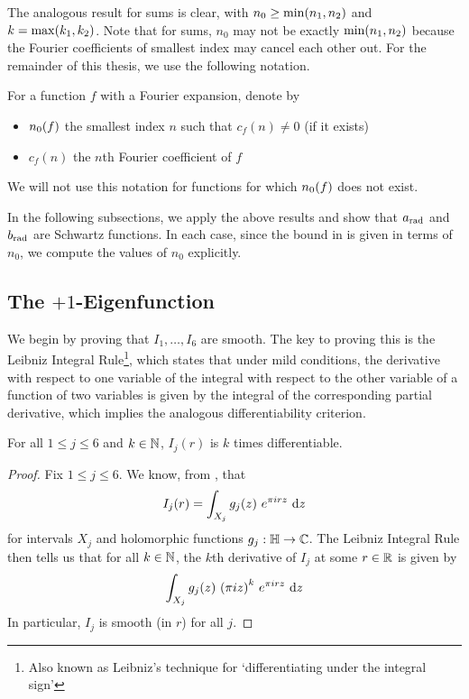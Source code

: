 The analogous result for sums is clear, with $n_0 \geq \min\!\left( n_1, n_2 \right)$ and $k = \max\!\left( k_1, k_2 \right)$. Note that for sums, $n_0$ may not be exactly $\min\!\left( n_1, n_2 \right)$ because the Fourier coefficients of smallest index may cancel each other out. For the remainder of this thesis, we use the following notation.

\begin{boxnotation}
    For a function $f$ with a Fourier expansion, denote by
    \begin{itemize}
        \item $n_0\!\left( f \right)$ the smallest index $n$ such that $c_f(n) \neq 0$ (if it exists)
        \item $c_f(n)$ the $n$th Fourier coefficient of $f$
    \end{itemize}
    We will not use this notation for functions for which $n_0\!\left( f \right)$ does not exist.
\end{boxnotation}

In the following subsections, we apply the above results and show that $a_{\operatorname{rad}}$ and $b_{\operatorname{rad}}$ are Schwartz functions. In each case, since the bound in  is given in terms of $n_0$, we compute the values of $n_0$ explicitly.

\subsection{The $+1$-Eigenfunction}
\label{Ch4:Subec:Schwartzness_a}

We begin by proving that $I_1, \ldots, I_6$ are smooth. The key to proving this is the Leibniz Integral Rule\footnote{Also known as Leibniz's technique for `differentiating under the integral sign'}, which states that under mild conditions, the derivative with respect to one variable of the integral with respect to the other variable of a function of two variables is given by the integral of the corresponding partial derivative, which implies the analogous differentiability criterion.

\begin{boxlemma}\label{Ch4:Lemma:Ij_Smooth}
    For all $1 \leq j \leq 6$ and $k \in \mathbb{N}$, $I_j(r)$ is $k$ times differentiable.
\end{boxlemma}
\begin{proof}
    Fix $1 \leq j \leq 6$. We know, from , that
    \begin{align*}
        I_j(r) = \int_{X_j} g_j\!\left( z \right) \, e^{\pi i r z} \, \operatorname{d}\!{z}
    \end{align*}
    for intervals $X_j$ and holomorphic functions $g_j : \mathbb{H} \to \mathbb{C}$. The Leibniz Integral Rule then tells us that for all $k \in \mathbb{N}$, the $k$th derivative of $I_j$ at some $r \in \mathbb{R}$ is given by
    \begin{align}
        \int_{X_j} g_j\!\left( z \right) \, \left( \pi i z \right)^{k} \, e^{\pi i r z} \, \operatorname{d}\!{z}
        \label{Ch4:Eq:Ij_deriv}
    \end{align}
    In particular, $I_j$ is smooth (in $r$) for all $j$.
\end{proof}


